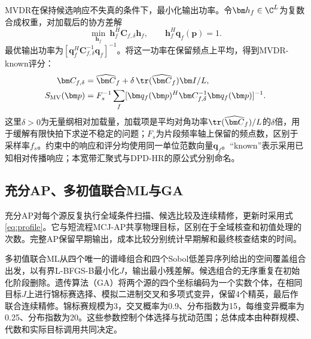 MVDR在保持候选响应不失真的条件下，最小化输出功率\cite{Capon1969}。令$\bm h_f\in\C^L$为复数合成权重，对加载后的协方差解
\begin{equation}
 \min_{\bm h_f}\ \bm h_f^H\bm C_{f,\delta}\bm h_f,
 \qquad \bm h_f^H\bm q_f(\bm p)=1.\label{eq:mvdrConstraint}
\end{equation}
最优输出功率为$[\bm q_f^H\bm C_{f,\delta}^{-1}\bm q_f]^{-1}$。将这一功率在保留频点上平均，得到MVDR-known评分：
\begin{align}
 \bm C_{f,\delta}&=\widehat{\bm C}_f+
 \delta\,\tr(\widehat{\bm C}_f)\bm I/L,\nonumber\\
 S_{\mathrm{MV}}(\bm p)&=F_s^{-1}\sum_f
 [\bm q_f(\bm p)^H\bm C_{f,\delta}^{-1}\bm q_f(\bm p)]^{-1} .\label{eq:mvdr}
\end{align}
这里$\delta>0$为无量纲相对加载量，加载项是平均对角功率$\tr(\widehat{\bm C}_f)/L$的$\delta$倍，用于缓解有限快拍下求逆不稳定的问题；$F_s$为片段频率轴上保留的频点数，区别于采样率$f_s$。约束中的响应和评分均使用同一单位范数向量$\bm q_f$。“known”表示采用已知相对传播响应；本宽带汇聚式与DPD-HR的原公式分别命名\cite{TirerWeiss2016}。

\subsection{充分AP、多初值联合ML与GA}
充分AP对每个源反复执行全域条件扫描、候选比较及连续精修，更新时采用式\eqref{eq:profile}\cite{ChenHudsonYao2002}。它与短流程MCJ-AP共享物理目标，区别在于全域核查和初值处理的次数。完整AP保留早期输出，成本比较分别统计早期解和最终核查结束的时间。

多初值联合ML从四个唯一的谱峰组合和四个Sobol低差异序列给出的空间覆盖组合出发，以有界L-BFGS-B最小化$J$，输出最小残差解。候选组合的无序重复在初始化阶段删除。遗传算法（GA）将两个源的四个坐标编码为一个实数个体，在相同目标$J$上进行锦标赛选择、模拟二进制交叉和多项式变异\cite{DebAgrawal1995}，保留4个精英，最后作联合连续精修。锦标赛规模为3，交叉概率为0.9、分布指数为15，每维变异概率为0.25、分布指数为20。这些参数控制个体选择与扰动范围；总体成本由种群规模、代数和实际目标调用共同决定。

